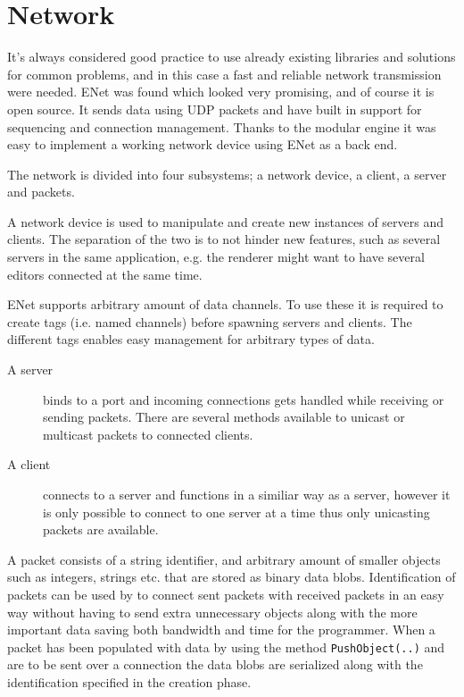 \section{Network}
It's always considered good practice to use already existing libraries and solutions for common problems, and in this case a fast and reliable network transmission were needed.
ENet was found which looked very promising, and of course it is open source. It sends data using UDP packets and have built in support for sequencing and connection management. 
Thanks to the modular engine it was easy to implement a working network device using ENet as a back end.

The network is divided into four subsystems; a network device, a client, a server and packets.

A network device is used to manipulate and create new instances of servers and clients. The separation of the two is to not hinder new features, such as several servers in the same application, e.g. the renderer might want to have several editors connected at the same time.

ENet supports arbitrary amount of data channels. To use these it is required to create tags (i.e. named channels) before spawning servers and clients. The different tags enables easy management for arbitrary types of data.

\begin{description}
	\item[A server] binds to a port and incoming connections gets handled while \mbox{receiving} or sending packets. There are several methods available to unicast or multicast packets to connected clients.
	\item[A client] connects to a server and functions in a similiar way as a server, however it is only possible to connect to one server at a time thus only unicasting packets are available.
\end{description}

A packet consists of a string identifier, and arbitrary amount of smaller \mbox{objects} such as integers, strings etc. that are stored as binary data blobs.
Identification of packets can be used by to connect sent packets with received packets in an easy way without having to send extra unnecessary objects along with the more important data saving both bandwidth and time for the programmer.
When a packet has been populated with data by using the method \texttt{PushObject(..)} and are to be sent over a connection the data blobs are serialized along with the identification specified in the creation phase.


